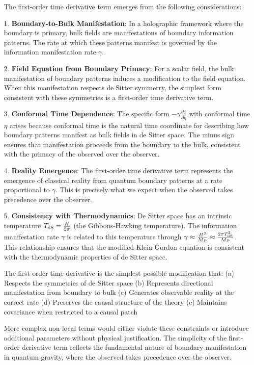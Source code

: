 \documentclass[11pt,english,twoside]{article}
\theoremstyle{plain}
\theoremstyle{definition}
\theoremstyle{remark}
\newcommand{\dS}{{\rm dS}}
\newcommand{\gammaR}{\gamma}
\begin{document}
The first-order time derivative term emerges from the following considerations:

1. \textbf{Boundary-to-Bulk Manifestation}: In a holographic framework where the boundary is primary, bulk fields are manifestations of boundary information patterns. The rate at which these patterns manifest is governed by the information manifestation rate $\gammaR$.

2. \textbf{Field Equation from Boundary Primacy}: For a scalar field, the bulk manifestation of boundary patterns induces a modification to the field equation. When this manifestation respects de Sitter symmetry, the simplest form consistent with these symmetries is a first-order time derivative term.

3. \textbf{Conformal Time Dependence}: The specific form $-\gammaR \frac{\partial\phi}{\partial\eta}$ with conformal time $\eta$ arises because conformal time is the natural time coordinate for describing how boundary patterns manifest as bulk fields in de Sitter space. The minus sign ensures that manifestation proceeds from the boundary to the bulk, consistent with the primacy of the observed over the observer.

4. \textbf{Reality Emergence}: The first-order time derivative term represents the emergence of classical reality from quantum boundary patterns at a rate proportional to $\gammaR$. This is precisely what we expect when the observed takes precedence over the observer.

5. \textbf{Consistency with Thermodynamics}: De Sitter space has an intrinsic temperature $T_{\dS} = \frac{H}{2\pi}$ (the Gibbons-Hawking temperature). The information manifestation rate $\gammaR$ is related to this temperature through $\gammaR \approx \frac{H^2}{M_P} \approx \frac{2\pi T_{\dS}^2}{M_P}$. This relationship ensures that the modified Klein-Gordon equation is consistent with the thermodynamic properties of de Sitter space.

The first-order time derivative is the simplest possible modification that:
(a) Respects the symmetries of de Sitter space
(b) Represents directional manifestation from boundary to bulk
(c) Generates observable reality at the correct rate
(d) Preserves the causal structure of the theory
(e) Maintains covariance when restricted to a causal patch

More complex non-local terms would either violate these constraints or introduce additional parameters without physical justification. The simplicity of the first-order derivative term reflects the fundamental nature of boundary manifestation in quantum gravity, where the observed takes precedence over the observer.
\end{document}
